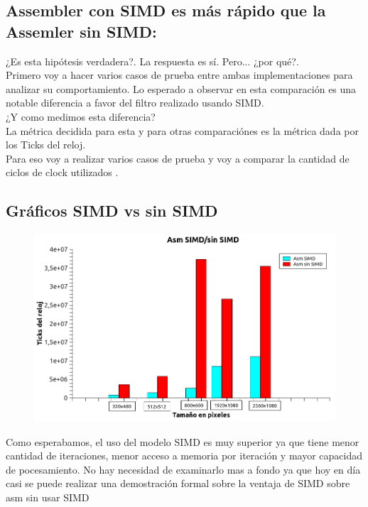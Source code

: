 \subsection{Assembler con SIMD es más rápido que la Assemler sin SIMD:}

¿Es esta hipótesis verdadera?. La respuesta es sí. Pero... ¿por qué?. \\
Primero voy a hacer varios casos de prueba entre ambas implementaciones para analizar su comportamiento. Lo esperado a observar en esta comparación es una notable diferencia a favor del filtro realizado usando SIMD.\\
¿Y como medimos esta diferencia?\\
 La métrica decidida para esta y para otras comparaciónes es la métrica dada por los Ticks del reloj.\\
 Para eso voy a realizar varios casos de prueba y voy a comparar la cantidad de ciclos de clock utilizados .\\

 \subsection{Gráficos SIMD vs sin SIMD}



 \begin{figure}[H]
\begin{center}
  \includegraphics[width=\linewidth]{diffsinsimd/simd.sinSIMD.png}
\end{center}
\end{figure}

 Como esperabamos, el uso del modelo SIMD es muy superior ya que tiene menor cantidad de iteraciones, menor acceso a memoria por iteración y mayor capacidad de pocesamiento. No hay necesidad de examinarlo mas a fondo ya que hoy en día casi se puede realizar una demostración formal sobre la ventaja de SIMD sobre asm sin usar SIMD\\
